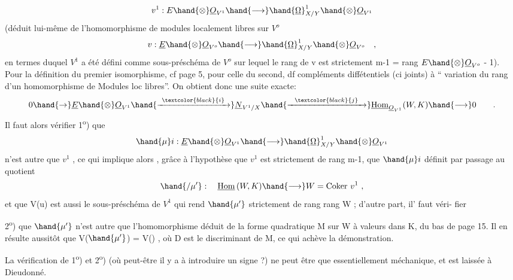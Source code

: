 
\[ v^1 : E\hand{\otimes}\underline{O}_{V^1} \hand{\longrightarrow} \hand{\underline{\Omega}}^1_{X/Y}\hand{\otimes}\underline{O}_{V^1} \]
 (déduit  lui-même de l'homomorphisme de modules
localement libres sur $V^o$
\[ v : \underline{E}\hand{\otimes}\underline{O}_{V^o} \hand{\longrightarrow} \hand{\underline{\Omega}}^1_{X/Y}\hand{\otimes} \underline{O}_{V^o} \quad , \]
en termes duquel  $V^1$ a été défini comme  sous-préschéma de $V^o$ sur lequel
le rang de v est strictement \hand{$\leqslant$} m-1 = rang $E\hand{\otimes}\underline{O}_{V^o}$ - 1). Pour la définition
du premier isomorphisme, cf page 5, pour celle du second, df compléments
diffétentiels (ci joints) à `` variation du rang d'un homomorphisme de
Modules loc libres''. On obtient donc une suite exacte:
\[ 0 \hand{\to} \underline{E}\hand{\otimes}\underline{O}_{V^1} \hand{\xrightarrow{\ \textcolor{black}{i}\ }} \underline{N}_{V^1/X} \hand{\xrightarrow{\ \ \textcolor{black}{j}\ \ }} \underline{\mathrm{Hom}}_{\underline{O}_{V^1}}(W,K) \hand{\longrightarrow} 0 \qquad . \]
Il faut alors vérifier 
1\textsuperscript{o}) que
\[ \hand{\mu}i : \underline{E}\hand{\otimes}\underline{O}_{V^1} \hand{\longrightarrow} \hand{\underline{\Omega}}^1_{X/Y}\hand{\otimes}\underline{O}_{V^1} \]
n'est autre que $v^1$ , ce qui implique alors , grâce à l'hypothèse que
$v^1$ est strictement de rang m-1, que  $\hand{\mu}i$ définit par passage au
quotient
\[ \hand{/\mu'} : \quad \underline{\mathrm{Hom}}\,(W,K) \hand{\longrightarrow} W = \mathrm{Coker}\ v^1 \ , \]
et que V(u) est aussi le sous-préschéma de $V^1$ qui rend $\hand{\mu'}$ strictement
de rang \hand{\unsure{$<|\leqslant$}}rang W  ; d'autre part, il'  faut véri-%
fier

2\textsuperscript{o}) que $\hand{\mu'}$ n'est autre que l'homomorphisme déduit de la forme
quadratique  M sur W à valeurs dans K, du bas de page 15. Il en résulte
aussitôt que V($\hand{\mu'}$) = V() , où D est le discriminant de M, ce  qui
achève la démonstration.

La vérification de 1\textsuperscript{o}) et 2\textsuperscript{o}) (où peut-être il y a à introduire un
signe ?) ne peut être que essentiellement méchanique, et est laissée à
Dieudonné.

